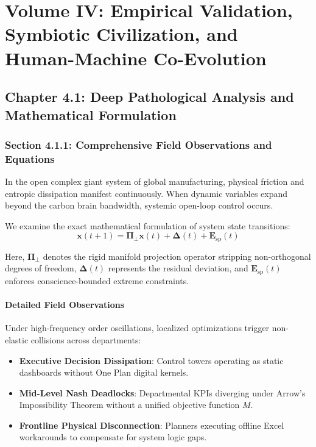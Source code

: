 \documentclass[12pt,a4paper,oneside]{book}
\begin{document}
\part{Volume IV: Empirical Validation, Symbiotic Civilization, and Human-Machine Co-Evolution}
\chapter{Chapter 4.1: Deep Pathological Analysis and Mathematical Formulation}
\section{Section 4.1.1: Comprehensive Field Observations and Equations}

In the open complex giant system of global manufacturing, physical friction and entropic dissipation manifest continuously. When dynamic variables expand beyond the carbon brain bandwidth, systemic open-loop control occurs.

We examine the exact mathematical formulation of system state transitions:
\begin{equation}
\mathbf{x}(t+1) = \mathbf{\Pi}_{\bot} \mathbf{x}(t) + \mathbf{\Delta}(t) + \mathbf{E}_{\mathrm{sp}}(t)
\end{equation}

Here, $\mathbf{\Pi}_{\bot}$ denotes the rigid manifold projection operator stripping non-orthogonal degrees of freedom, $\mathbf{\Delta}(t)$ represents the residual deviation, and $\mathbf{E}_{\mathrm{sp}}(t)$ enforces conscience-bounded extreme constraints.

\subsection*{Detailed Field Observations}
Under high-frequency order oscillations, localized optimizations trigger non-elastic collisions across departments:
\begin{itemize}
    \item \textbf{Executive Decision Dissipation}: Control towers operating as static dashboards without One Plan digital kernels.
    \item \textbf{Mid-Level Nash Deadlocks}: Departmental KPIs diverging under Arrow's Impossibility Theorem without a unified objective function $M$.
    \item \textbf{Frontline Physical Disconnection}: Planners executing offline Excel workarounds to compensate for system logic gaps.
\end{itemize}
\end{document}

